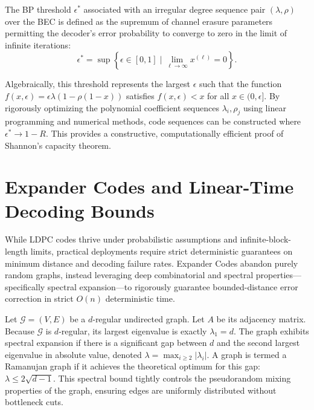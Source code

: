 \begin{definition}
The BP threshold $\epsilon^*$ associated with an irregular degree sequence pair $(\lambda, \rho)$ over the BEC is defined as the supremum of channel erasure parameters permitting the decoder's error probability to converge to zero in the limit of infinite iterations:
\[
\epsilon^* = \sup \left\{ \epsilon \in [0, 1] \mid \lim_{\ell \to \infty} x^{(\ell)} = 0 \right\}.
\]
\end{definition}

Algebraically, this threshold represents the largest $\epsilon$ such that the function $f(x, \epsilon) = \epsilon \lambda(1 - \rho(1-x))$ satisfies $f(x, \epsilon) < x$ for all $x \in (0, \epsilon]$. By rigorously optimizing the polynomial coefficient sequences $\lambda_i, \rho_j$ using linear programming and numerical methods, code sequences can be constructed where $\epsilon^* \to 1 - R$. This provides a constructive, computationally efficient proof of Shannon's capacity theorem.

\section{Expander Codes and Linear-Time Decoding Bounds}

While LDPC codes thrive under probabilistic assumptions and infinite-block-length limits, practical deployments require strict deterministic guarantees on minimum distance and decoding failure rates. Expander Codes abandon purely random graphs, instead leveraging deep combinatorial and spectral properties---specifically spectral expansion---to rigorously guarantee bounded-distance error correction in strict $O(n)$ deterministic time.

\begin{definition}
Let $\mathcal{G} = (V, E)$ be a $d$-regular undirected graph. Let $A$ be its adjacency matrix. Because $\mathcal{G}$ is $d$-regular, its largest eigenvalue is exactly $\lambda_1 = d$. The graph exhibits spectral expansion if there is a significant gap between $d$ and the second largest eigenvalue in absolute value, denoted $\lambda = \max_{i \ge 2} |\lambda_i|$. A graph is termed a Ramanujan graph if it achieves the theoretical optimum for this gap: $\lambda \le 2\sqrt{d-1}$. This spectral bound tightly controls the pseudorandom mixing properties of the graph, ensuring edges are uniformly distributed without bottleneck cuts.
\end{definition}

